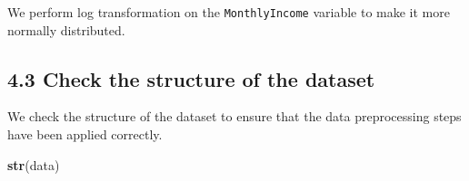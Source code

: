 \documentclass[
]{article}
\newenvironment{Shaded}{\begin{snugshade}}{\end{snugshade}}
\newcommand{\FunctionTok}[1]{\textcolor[rgb]{0.13,0.29,0.53}{\textbf{#1}}}
\newcommand{\NormalTok}[1]{#1}
\newcommand{\OtherTok}[1]{\textcolor[rgb]{0.56,0.35,0.01}{#1}}
\newcommand{\SpecialCharTok}[1]{\textcolor[rgb]{0.81,0.36,0.00}{\textbf{#1}}}
\begin{document}
We perform log transformation on the \texttt{MonthlyIncome} variable to
make it more normally distributed.

\begin{Shaded}
\end{Shaded}

\hypertarget{check-the-structure-of-the-dataset}{%
\subsection{4.3 Check the structure of the
dataset}\label{check-the-structure-of-the-dataset}}

We check the structure of the dataset to ensure that the data
preprocessing steps have been applied correctly.

\begin{Shaded}
\begin{Highlighting}[]
\FunctionTok{str}\NormalTok{(data)}
\end{Highlighting}
\end{Shaded}
\end{document}
